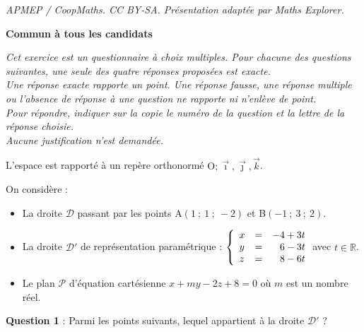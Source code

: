 \documentclass[10pt]{article}
\providecommand{\R}{\mathbb{R}}
\providecommand{\Oijk}{\(\mathrm{O};\vec{\imath},\vec{\jmath},\vec{k}\)}
\begin{document}
\noindent\textit{APMEP / CoopMaths. CC BY-SA. Présentation adaptée par Maths Explorer.}\par\medskip
\textbf{Commun à tous les candidats}

\medskip

\emph{Cet exercice est un questionnaire à choix multiples. Pour chacune des questions suivantes, une seule des quatre réponses proposées est exacte. \\
Une réponse exacte rapporte un point. Une réponse fausse, une réponse multiple ou l'absence de réponse à une question ne rapporte ni n'enlève de point.\\
Pour répondre, indiquer sur la copie le numéro de la question et la lettre de la réponse choisie.\\
Aucune justification n'est demandée.}

\medskip

L'espace  est rapporté à un repère orthonormé \Oijk. 

On considère :

\setlength\parindent{9mm}
\begin{itemize}
\item[$\bullet~~$]La droite $\mathcal{D}$ passant par les points A$(1~;~1~;~ -2)$ et B$(-1~;~3~;~2)$. 
\item[$\bullet~~$]La droite $\mathcal{D}'$ de représentation paramétrique :
$\left\{\begin{array}{l c l}
x &=& -4 +3t\\
y&=&\phantom{-}6 - 3t\\
z&=&\phantom{-}8 - 6t
\end{array}\right.$\quad avec $t \in \R$.
\item[$\bullet~~$]Le plan $\mathcal{P}$ d'équation cartésienne $x + my- 2z + 8 = 0$ où $m$ est un nombre réel.
\end{itemize}
\setlength\parindent{0mm}

\medskip

\textbf{Question 1} : Parmi les points suivants, lequel appartient à la droite $\mathcal{D}'$ ?
\end{document}
